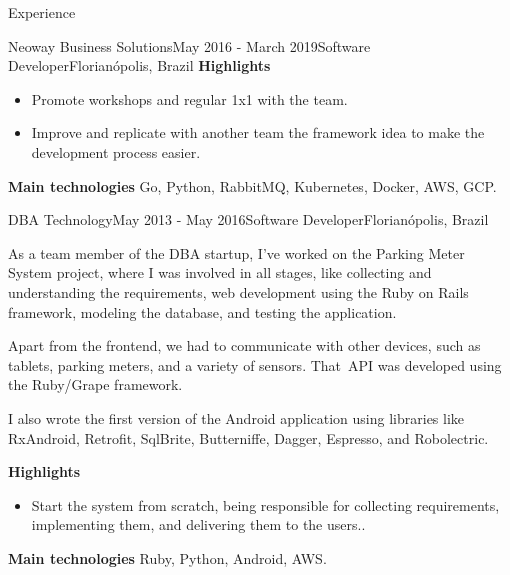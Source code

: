 \documentclass[
	a4paper, %
	10pt, %
]{resume} %
\begin{document}
\begin{rSection}{Experience}
\begin{rSubsection}{Neoway Business Solutions}{May 2016 - March 2019}{Software Developer}{Florianópolis, Brazil}
		\textbf{Highlights}
		\begin{itemize}
			\item Promote workshops and regular 1x1 with the team.
			\item Improve and replicate with another team the framework idea to make the development process easier.
		\end{itemize}

		\textbf{Main technologies}
			Go, Python, RabbitMQ, Kubernetes, Docker, AWS, GCP.

	\end{rSubsection}


	\begin{rSubsection}{DBA Technology}{May 2013 - May 2016}{Software Developer}{Florianópolis, Brazil}
		\item[]
		As a team member of the DBA startup, I've worked on the Parking Meter System project, where I was involved in all stages, like collecting and understanding the requirements, web development using the Ruby on Rails framework, modeling the database, and testing the application.

		Apart from the frontend, we had to communicate with other devices, such as tablets, parking meters, and a variety of sensors. That API was developed using the Ruby/Grape framework.

		I also wrote the first version of the Android application using libraries like RxAndroid, Retrofit, SqlBrite, Butterniffe, Dagger, Espresso, and Robolectric.

		\textbf{Highlights}
		\begin{itemize}
			\item Start the system from scratch, being responsible for collecting requirements, implementing them, and delivering them to the users..
		\end{itemize}

		\textbf{Main technologies}
			Ruby, Python, Android, AWS.

	\end{rSubsection}

\end{rSection}



\end{document}
